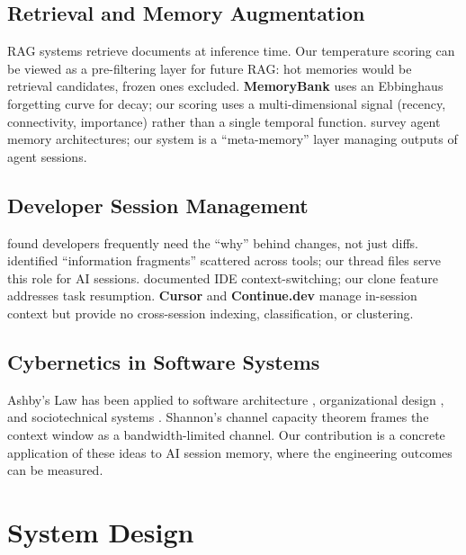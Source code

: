 \documentclass[11pt]{article}
\begin{document}
\subsection{Retrieval and Memory Augmentation}

RAG systems \citep{lewis2020rag,gao2024ragsurvey} retrieve documents at inference time. Our temperature scoring can be viewed as a pre-filtering layer for future RAG: hot memories would be retrieval candidates, frozen ones excluded. \textbf{MemoryBank} \citep{zhong2024memorybank} uses an Ebbinghaus forgetting curve for decay; our scoring uses a multi-dimensional signal (recency, connectivity, importance) rather than a single temporal function. \citet{wang2024agents} survey agent memory architectures; our system is a ``meta-memory'' layer managing outputs of agent sessions.

\subsection{Developer Session Management}

\citet{codoban2015history} found developers frequently need the ``why'' behind changes, not just diffs. \citet{fritz2010fragments} identified ``information fragments'' scattered across tools; our thread files serve this role for AI sessions. \citet{murphy2006eclipse} documented IDE context-switching; our clone feature addresses task resumption. \textbf{Cursor} \citep{cursor2024} and \textbf{Continue.dev} \citep{continue2024} manage in-session context but provide no cross-session indexing, classification, or clustering.

\subsection{Cybernetics in Software Systems}

Ashby's Law \citep{ashby1956} has been applied to software architecture \citep{bider2016ashby}, organizational design \citep{beer1979,espejo2011vsm}, and sociotechnical systems \citep{boisot2011complexity}. Shannon's channel capacity theorem \citep{shannon1948} frames the context window as a bandwidth-limited channel. Our contribution is a concrete application of these ideas to AI session memory, where the engineering outcomes can be measured.

\section{System Design}
\end{document}
